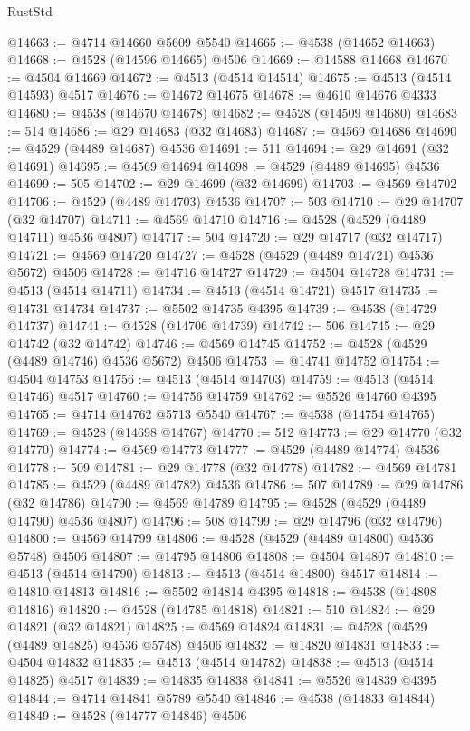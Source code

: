 \begin{lexlean}{RustStd}
\begin{coremodule}
@14663 := @4714 @14660 @5609 @5540
@14665 := @4538 (@14652 @14663)
@14668 := @4528 (@14596 @14665) @4506
@14669 := @14588 @14668
@14670 := @4504 @14669
@14672 := @4513 (@4514 @14514)
@14675 := @4513 (@4514 @14593) @4517
@14676 := @14672 @14675
@14678 := @4610 @14676 @4333
@14680 := @4538 (@14670 @14678)
@14682 := @4528 (@14509 @14680)
@14683 := 514
@14686 := @29 @14683 (@32 @14683)
@14687 := @4569 @14686
@14690 := @4529 (@4489 @14687) @4536
@14691 := 511
@14694 := @29 @14691 (@32 @14691)
@14695 := @4569 @14694
@14698 := @4529 (@4489 @14695) @4536
@14699 := 505
@14702 := @29 @14699 (@32 @14699)
@14703 := @4569 @14702
@14706 := @4529 (@4489 @14703) @4536
@14707 := 503
@14710 := @29 @14707 (@32 @14707)
@14711 := @4569 @14710
@14716 := @4528 (@4529 (@4489 @14711) @4536 @4807)
@14717 := 504
@14720 := @29 @14717 (@32 @14717)
@14721 := @4569 @14720
@14727 := @4528 (@4529 (@4489 @14721) @4536 @5672) @4506
@14728 := @14716 @14727
@14729 := @4504 @14728
@14731 := @4513 (@4514 @14711)
@14734 := @4513 (@4514 @14721) @4517
@14735 := @14731 @14734
@14737 := @5502 @14735 @4395
@14739 := @4538 (@14729 @14737)
@14741 := @4528 (@14706 @14739)
@14742 := 506
@14745 := @29 @14742 (@32 @14742)
@14746 := @4569 @14745
@14752 := @4528 (@4529 (@4489 @14746) @4536 @5672) @4506
@14753 := @14741 @14752
@14754 := @4504 @14753
@14756 := @4513 (@4514 @14703)
@14759 := @4513 (@4514 @14746) @4517
@14760 := @14756 @14759
@14762 := @5526 @14760 @4395
@14765 := @4714 @14762 @5713 @5540
@14767 := @4538 (@14754 @14765)
@14769 := @4528 (@14698 @14767)
@14770 := 512
@14773 := @29 @14770 (@32 @14770)
@14774 := @4569 @14773
@14777 := @4529 (@4489 @14774) @4536
@14778 := 509
@14781 := @29 @14778 (@32 @14778)
@14782 := @4569 @14781
@14785 := @4529 (@4489 @14782) @4536
@14786 := 507
@14789 := @29 @14786 (@32 @14786)
@14790 := @4569 @14789
@14795 := @4528 (@4529 (@4489 @14790) @4536 @4807)
@14796 := 508
@14799 := @29 @14796 (@32 @14796)
@14800 := @4569 @14799
@14806 := @4528 (@4529 (@4489 @14800) @4536 @5748) @4506
@14807 := @14795 @14806
@14808 := @4504 @14807
@14810 := @4513 (@4514 @14790)
@14813 := @4513 (@4514 @14800) @4517
@14814 := @14810 @14813
@14816 := @5502 @14814 @4395
@14818 := @4538 (@14808 @14816)
@14820 := @4528 (@14785 @14818)
@14821 := 510
@14824 := @29 @14821 (@32 @14821)
@14825 := @4569 @14824
@14831 := @4528 (@4529 (@4489 @14825) @4536 @5748) @4506
@14832 := @14820 @14831
@14833 := @4504 @14832
@14835 := @4513 (@4514 @14782)
@14838 := @4513 (@4514 @14825) @4517
@14839 := @14835 @14838
@14841 := @5526 @14839 @4395
@14844 := @4714 @14841 @5789 @5540
@14846 := @4538 (@14833 @14844)
@14849 := @4528 (@14777 @14846) @4506

\end{coremodule}
\end{lexlean}
